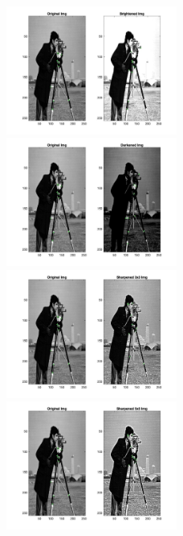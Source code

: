 \documentclass[12pt]{article}
\begin{document}
\begin{enumerate}
\begin{enumerate}
		\begin{figure}[H]
			\includegraphics[width=0.5\textwidth]{Q6B_bright_results.jpg}
			\includegraphics[width=0.5\textwidth]{Q6B_dark_results.jpg}
			\includegraphics[width=0.5\textwidth]{Q6B_sharp3_results.jpg}
			\includegraphics[width=0.5\textwidth]{Q6B_sharp5_results.jpg}
		\end{figure}
		

\end{enumerate}
\end{enumerate}
\end{document}
